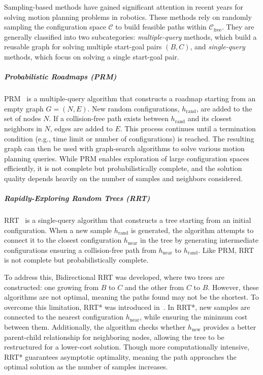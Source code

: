 Sampling-based methods have gained significant attention in recent years for solving motion planning problems in robotics. These methods rely on randomly sampling the configuration space $\mathcal{C}$ to build feasible paths within $\mathcal{C}_{\text{free}}$. They are generally classified into two subcategories: \textit{multiple-query} methods, which build a reusable graph for solving multiple start-goal pairs $(B, C)$, and \textit{single-query} methods, which focus on solving a single start-goal pair.

\subparagraph{Probabilistic Roadmaps (PRM)} 

PRM~\cite{PRM508439} is a multiple-query algorithm that constructs a roadmap starting from an empty graph $G = (N, E)$. New random configurations, $h_{\text{rand}}$, are added to the set of nodes $N$. If a collision-free path exists between $h_{\text{rand}}$ and its closest neighbors in $N$, edges are added to $E$. This process continues until a termination condition (e.g., time limit or number of configurations) is reached. The resulting graph can then be used with graph-search algorithms to solve various motion planning queries. While PRM enables exploration of large configuration spaces efficiently, it is not complete but probabilistically complete, and the solution quality depends heavily on the number of samples and neighbors considered.

\subparagraph{Rapidly-Exploring Random Trees (RRT)} 

RRT~\cite{lavalle2006planning} is a single-query algorithm that constructs a tree starting from an initial configuration. When a new sample $h_{\text{rand}}$ is generated, the algorithm attempts to connect it to the closest configuration $h_{\text{near}}$ in the tree by generating intermediate configurations ensuring a collision-free path from $h_{\text{near}}$ to $h_{\text{rand}}$. Like PRM, RRT is not complete but probabilistically complete. 

To address this, Bidirectional RRT was developed, where two trees are constructed: one growing from $B$ to $C$ and the other from $C$ to $B$. However, these algorithms are not optimal, meaning the paths found may not be the shortest. To overcome this limitation, RRT* was introduced in~\cite{karaman2011sampling}. In RRT*, new samples are connected to the nearest configuration $h_{\text{near}}$, while ensuring the minimum cost between them. Additionally, the algorithm checks whether $h_{\text{new}}$ provides a better parent-child relationship for neighboring nodes, allowing the tree to be restructured for a lower-cost solution. Though more computationally intensive, RRT* guarantees asymptotic optimality, meaning the path approaches the optimal solution as the number of samples increases.

